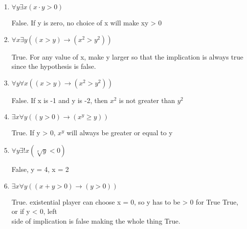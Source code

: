 \documentclass[11pt]{article}
\begin{document}
\begin{justify}
\begin{enumerate}
    \begin{enumerate}
        \item $\forall y \exists x(x \cdot y > 0)$ 
        \begin{mdframed}
            False. If y is zero, no choice of x will make xy > 0
        \end{mdframed}
        \item $\forall x \exists y((x > y) \rightarrow (x^2 > y^2))$
        \begin{mdframed}
            True. For any value of x, make y larger so that the implication is always true since the hypothesis is false.
        \end{mdframed}
        \item $\forall y \forall x((x > y) \rightarrow (x^2 > y^2))$
        \begin{mdframed}
            False. If x is -1 and y is -2, then $x^2$ is not greater than $y^2$
        \end{mdframed}
        \item $\exists x \forall y((y > 0) \rightarrow (x^y \geq y))$
        \begin{mdframed}
            True. If y > 0, $x^y$ will always be greater or equal to y
        \end{mdframed}
        \item $\forall y \exists ! x(\sqrt[x]{y} < 0)$
        \begin{mdframed}
            False, y = 4, x = 2
        \end{mdframed}
        \item $\exists x \forall y ((x + y > 0) \rightarrow (y > 0))$
        \begin{mdframed}
            True. existential player can choose x = 0, so y has to be > 0 for True True, or if y < 0, left\\  side of
            implication is false making the whole thing True.
        \end{mdframed}
    \end{enumerate}


\end{enumerate}
\end{justify}
\end{document}
